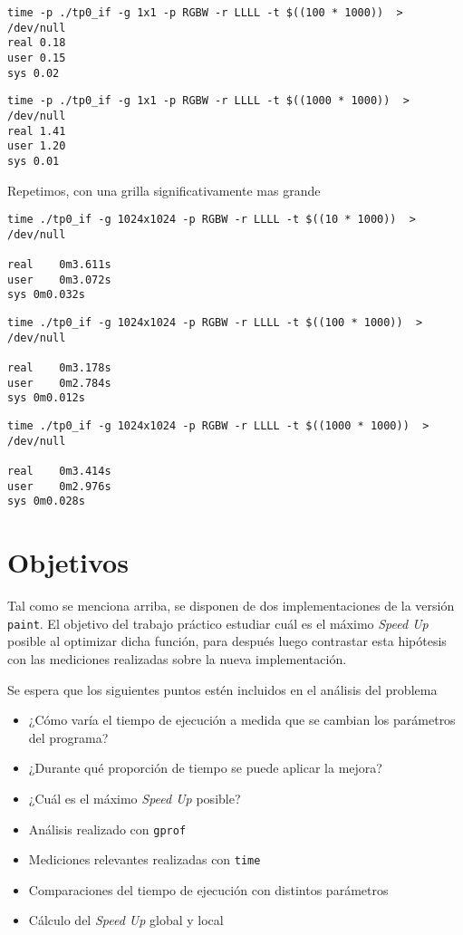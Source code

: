 \documentclass{article}
\newcommand {\SU}{\textit{Speed Up} }
\begin{document}
\begin{verbatim}
time -p ./tp0_if -g 1x1 -p RGBW -r LLLL -t $((100 * 1000))  > /dev/null
real 0.18
user 0.15
sys 0.02
\end{verbatim}

\begin{verbatim}
time -p ./tp0_if -g 1x1 -p RGBW -r LLLL -t $((1000 * 1000))  > /dev/null
real 1.41
user 1.20
sys 0.01
\end{verbatim}

Repetimos, con una grilla significativamente mas grande
\begin{verbatim}
time ./tp0_if -g 1024x1024 -p RGBW -r LLLL -t $((10 * 1000))  > /dev/null

real	0m3.611s
user	0m3.072s
sys	0m0.032s
\end{verbatim}

\begin{verbatim}
time ./tp0_if -g 1024x1024 -p RGBW -r LLLL -t $((100 * 1000))  > /dev/null

real	0m3.178s
user	0m2.784s
sys	0m0.012s
\end{verbatim}

\begin{verbatim}
time ./tp0_if -g 1024x1024 -p RGBW -r LLLL -t $((1000 * 1000))  > /dev/null

real	0m3.414s
user	0m2.976s
sys	0m0.028s
\end{verbatim}

\section{Objetivos}
Tal como se menciona arriba, se disponen de dos implementaciones de la versión \texttt{paint}. 
El objetivo del trabajo práctico estudiar cuál es el máximo \SU posible al optimizar dicha función, para después  
luego contrastar esta hipótesis con las mediciones realizadas sobre la nueva implementación.

Se espera que los siguientes puntos estén incluidos en el análisis del problema
\begin{itemize}
\item ¿Cómo varía el tiempo de ejecución a medida que se cambian los parámetros del programa?
\item ¿Durante qué proporción de tiempo se puede aplicar la mejora?
\item ¿Cuál es el máximo \SU posible?
\item Análisis realizado con \texttt{gprof}
\item Mediciones relevantes realizadas con \texttt{time}
\item Comparaciones del tiempo de ejecución con distintos parámetros
\item Cálculo del \SU global y local
\end{itemize}
\end{document}
